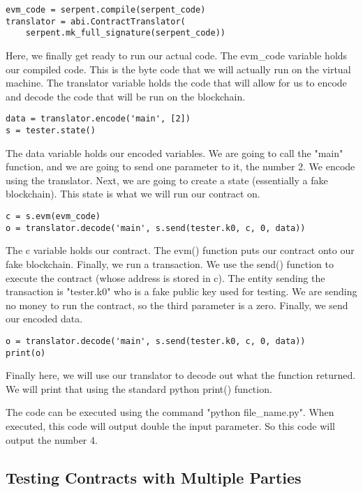 \documentclass[12pt]{article}
\begin{document}
\begin{lstlisting}
evm_code = serpent.compile(serpent_code)
translator = abi.ContractTranslator(
	serpent.mk_full_signature(serpent_code))
\end{lstlisting}

Here, we finally get ready to run our actual code. The evm\_code variable holds our compiled code. This is the byte code that we will actually run on the virtual machine. The translator variable holds the code that will allow for us to encode and decode the code that will be run on the blockchain.

\begin{lstlisting}
data = translator.encode('main', [2])
s = tester.state()
\end{lstlisting}

The data variable holds our encoded variables. We are going to call the "main" function, and we are going to send one parameter to it, the number 2. We encode using the translator. Next, we are going to create a state (essentially a fake blockchain). This state is what we will run our contract on. 

\begin{lstlisting}
c = s.evm(evm_code)
o = translator.decode('main', s.send(tester.k0, c, 0, data))
\end{lstlisting}

The c variable holds our contract. The evm() function puts our contract onto our fake blockchain. Finally, we run a transaction. We use the send() function to execute the contract (whose address is stored in c). The entity sending the transaction is "tester.k0" who is a fake public key used for testing. We are sending no money to run the contract, so the third parameter is a zero. Finally, we send our encoded data.

\begin{lstlisting}
o = translator.decode('main', s.send(tester.k0, c, 0, data))
print(o)
\end{lstlisting}

Finally here, we will use our translator to decode out what the function returned. We will print that using the standard python print() function.

The code can be executed using the command "python file\_name.py". When executed, this code will output double the input parameter. So this code will output the number 4. \cite{test_contracts.py,Using pyethereum.tester}

\subsection{Testing Contracts with Multiple Parties}
\end{document}

